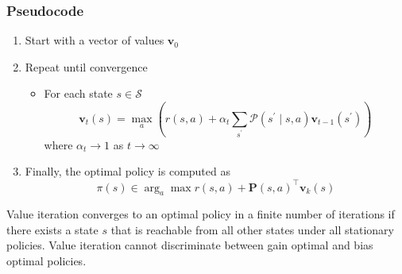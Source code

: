 \subsubsection*{Pseudocode}
\begin{enumerate}
    \item Start with a vector of values $\mathbf{v}_0$
    \item Repeat until convergence 
    
    \begin{itemize}
        \item For each state $s \in \mathcal{S}$
        $$\mathbf{v}_t(s) = \max_a \left(r(s, a) + \alpha_t \sum_{s^\prime} \mathcal{P}(s^\prime \mid s, a) \mathbf{v}_{t-1}(s^\prime) \right)$$
        where $\alpha_t \to 1$ as $t \to \infty$
    \end{itemize}
    
    
    \item Finally, the optimal policy is computed as
    $$\pi(s) \in \arg_a\max r(s,a) + \mathbf{P}(s,a)^\top \mathbf{v}_k(s) $$
    
\end{enumerate}

Value iteration converges to an optimal policy in a finite number of iterations if there exists a state $s$ that is reachable from all other states under all stationary policies.
Value iteration cannot discriminate between gain optimal and bias optimal policies.


